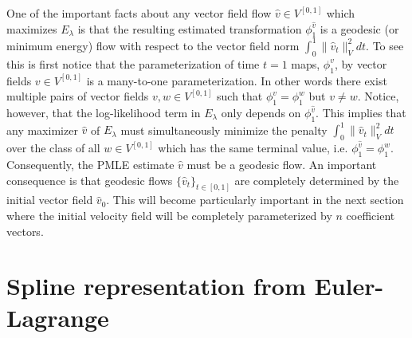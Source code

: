 \documentclass[noinfoline]{imsart}
\begin{document}
One of the important facts about any vector field flow $\hat v\in V^{[0,1]}$ which maximizes $E_\lambda$  is that the resulting estimated transformation  $\phi_1^{\hat v}$ is a geodesic (or minimum energy) flow with respect to the vector field norm $\int_0^1 \| \hat v_t\|^2_V dt$. To see this is first notice that the parameterization of time $t=1$ maps, $\phi_1^v$, by vector fields $v\in V^{[0,1]}$ is a many-to-one  parameterization.
In other words there exist multiple pairs of vector fields $v,w\in V^{[0,1]}$ such that $\phi_1^v =\phi^w_1$ but $v\neq w$. Notice, however, that the log-likelihood term in $E_\lambda$ only depends on   $\phi_1^{\hat v}$. This implies that any maximizer $\hat v$ of $E_\lambda$ must simultaneously minimize  the penalty $\int_0^1 \| \hat v_t\|^2_V dt$ over the class of all $w\in V^{[0,1]}$ which has the same terminal value, i.e.\! $\phi^{\hat v}_1=\phi^w_1$.
 Consequently, the PMLE estimate $\hat v$ must be a geodesic flow. An important consequence  is that  geodesic flows $\{ \hat v_t \}_{t\in [0,1]}$ are completely determined by the initial vector field $\hat v_0$.  This will become particularly important in the next section where the initial velocity field will be completely parameterized by $n$ coefficient vectors.

%
%
%
%
\section{Spline representation from Euler-Lagrange}
\label{EL}
\end{document}
